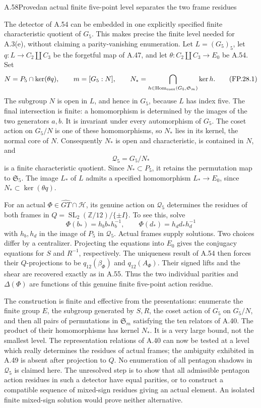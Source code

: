 \begin{statement}{A.58}{Proved}{an actual finite five-point level separates the two frame residues}
\end{statement}
The detector of A.54 can be embedded in one explicitly specified finite
characteristic quotient of $G_5$. This makes precise the finite level
needed for A.3(e), without claiming a parity-vanishing enumeration.
Let $L=(G_5)_5$, let $q:L\to C_2\amalg C_3$ be the forgetful map
of A.47, and let $\theta:C_2\amalg C_3\to E_0$ be A.54.
Set
\[
 N=P_5\cap\ker(\theta q),\qquad m=[G_5:N],\qquad
 N_*=\bigcap_{h\in\operatorname{Hom}_{\rm cont}
                         (G_5,\mathfrak S_m)}\ker h.
 \tag{FP.28.1}
\]
The subgroup $N$ is open in $L$, and hence in $G_5$, because $L$
has index five. The final intersection is finite: a homomorphism is
determined by the images of the two generators $a,b$. It is invariant
under every automorphism of $G_5$. The coset action on $G_5/N$ is one
of these homomorphisms, so $N_*$ lies in its kernel, the normal core
of $N$. Consequently $N_*$ is open and characteristic, is contained
in $N$, and
\[
 \mathcal Q_5=G_5/N_*
\]
is a finite characteristic quotient. Since $N_*\subset P_5$, it
retains the permutation map to $\mathfrak S_5$. The image $L_*$ of
$L$ admits a specified homomorphism $L_*\to E_0$, since
$N_*\subset\ker(\theta q)$.

For an actual $\Phi\in\widehat{GT}\cap\mathcal H$, its genuine
action on $\mathcal Q_5$ determines the residues of both frames in
$Q=\operatorname{SL}_2(\mathbb Z/12)/\{\pm I\}$.
To see this, solve
\[
 \Phi(b_*)=h_b b_*h_b^{-1},\qquad
 \Phi(d_*)=h_d d_*h_d^{-1}
 \tag{FP.28.2}
\]
with $h_b,h_d$ in the image of $P_5$ in $\mathcal Q_5$.
Actual frames supply solutions. Two choices differ by a centralizer.
Projecting the equations into $E_0$ gives the conjugacy equations
for $S$ and $R^{-1}$, respectively. The uniqueness result of A.54
then forces their $Q$-projections to be
$q_{12}(\beta_\Phi)$ and $q_{12}(A_\Phi)$. Their signed lifts and
the shear are recovered exactly as in A.55. Thus the two individual
parities and $\Delta(\Phi)$ are functions of this genuine finite
five-point action residue.

The construction is finite and effective from the presentations:
enumerate the finite group $E$, the subgroup generated by $S,R$,
the coset action of $G_5$ on $G_5/N$, and then all pairs of
permutations in $\mathfrak S_m$ satisfying the ten relators of A.40.
The product of their homomorphisms has kernel $N_*$.
It is a very large bound, not the smallest level. The representation
relations of A.40 can now be tested at a level which really determines
the residues of actual frames; the ambiguity exhibited in A.49 is
absent after projection to $Q$. No enumeration of all pentagon shadows
in $\mathcal Q_5$ is claimed here. The unresolved step is to show
that all admissible pentagon action residues in such a detector have
equal parities, or to construct a compatible sequence of mixed-sign
residues giving an actual element. An isolated finite mixed-sign
solution would prove neither alternative.

